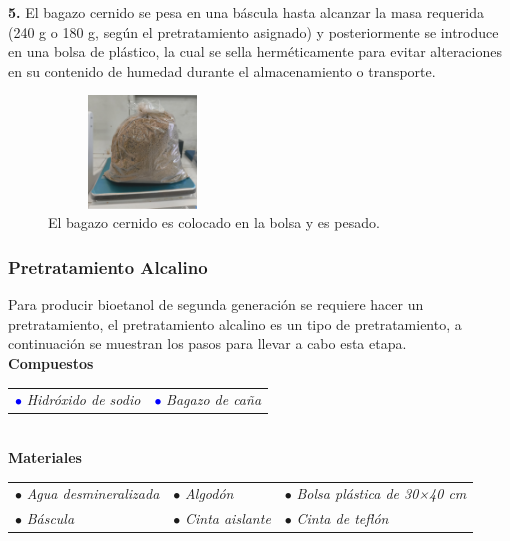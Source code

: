 \documentclass[12pt]{article}
\begin{document}
	
			\textbf{5.} El bagazo cernido se pesa en una báscula hasta alcanzar la masa requerida (240 g o 180 g, según el pretratamiento asignado) y posteriormente se introduce en una bolsa de plástico, la cual se sella herméticamente para evitar alteraciones en su contenido de humedad durante el almacenamiento o transporte.
			
			
			\begin{figure} [H]
				\centering
				\includegraphics[width=5cm, height=3cm]{imagenes/cernir_bagazo_pesado}
				\caption{El bagazo cernido es colocado en la bolsa y es pesado.}
				\label{cernir_bagazo_pesado}
			\end{figure}
			
			
			
						\subsubsection{Pretratamiento Alcalino}
	Para producir bioetanol de segunda generación se requiere hacer un pretratamiento, el pretratamiento alcalino es un tipo de pretratamiento, a continuación se muestran los pasos para llevar a cabo esta etapa.		
		\\[1 em]
			\textbf{Compuestos} 
			\\[0.5em]
			
			\begin{tabular}{p{0.3\textwidth}p{}}
		\textcolor{blue}{$\bullet$} \textit{Hidróxido de sodio} &	\textcolor{blue}{$\bullet$}\textit{ Bagazo de caña} 
			\end{tabular} \\[ 1em]
			
		
		
			\textbf{Materiales} 
			\\[1 em]
					
\begin{tabular}{p{}p{}p{}}
	$\bullet$ \textit{Agua desmineralizada }& $\bullet$ \textit{Algodón }& $\bullet$ \textit{Bolsa plástica de 30×40 cm} \\
	$\bullet$ \textit{Báscula} & $\bullet$ \textit{Cinta aislante} & $\bullet$ \textit{Cinta de teflón}
\end{tabular}
\\[0.5em]
\end{document}

